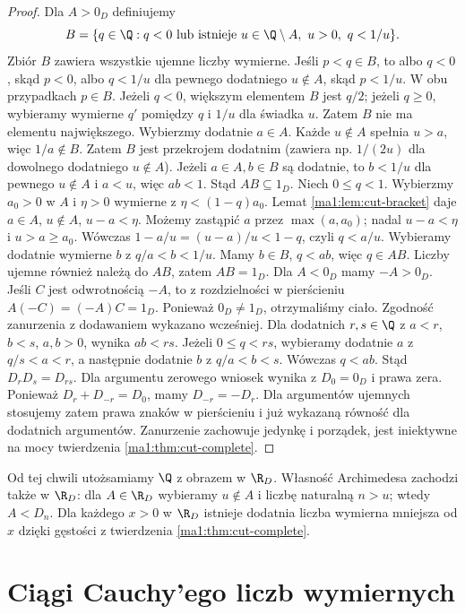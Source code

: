 \begin{proof}
Dla $A>0_D$ definiujemy
\[
 B=\{q\in\Q:q<0\ \text{lub istnieje }u\in\Q\setminus A,\ u>0,\ q<1/u\}.
\]
Zbiór $B$ zawiera wszystkie ujemne liczby wymierne. Jeśli $p<q\in B$, to albo $q<0$, skąd $p<0$, albo $q<1/u$ dla pewnego dodatniego $u\notin A$, skąd $p<1/u$. W obu przypadkach $p\in B$. Jeżeli $q<0$, większym elementem $B$ jest $q/2$; jeżeli $q\ge0$, wybieramy wymierne $q'$ pomiędzy $q$ i $1/u$ dla świadka $u$. Zatem $B$ nie ma elementu największego. Wybierzmy dodatnie $a\in A$. Każde $u\notin A$ spełnia $u>a$, więc $1/a\notin B$. Zatem $B$ jest przekrojem dodatnim (zawiera np. $1/(2u)$ dla dowolnego dodatniego $u\notin A$).
Jeżeli $a\in A,b\in B$ są dodatnie, to $b<1/u$ dla pewnego $u\notin A$ i $a<u$, więc $ab<1$. Stąd $AB\subseteq1_D$. Niech $0\le q<1$. Wybierzmy $a_0>0$ w $A$ i $\eta>0$ wymierne z $\eta<(1-q)a_0$. Lemat \ref{ma1:lem:cut-bracket} daje $a\in A$, $u\notin A$, $u-a<\eta$. Możemy zastąpić $a$ przez $\max(a,a_0)$; nadal $u-a<\eta$ i $u>a\ge a_0$. Wówczas $1-a/u=(u-a)/u<1-q$, czyli $q<a/u$. Wybieramy dodatnie wymierne $b$ z $q/a<b<1/u$. Mamy $b\in B$, $q<ab$, więc $q\in AB$. Liczby ujemne również należą do $AB$, zatem $AB=1_D$. Dla $A<0_D$ mamy $-A>0_D$. Jeśli $C$ jest odwrotnością $-A$, to z rozdzielności w pierścieniu $A(-C)=(-A)C=1_D$. Ponieważ $0_D\ne1_D$, otrzymaliśmy ciało.
Zgodność zanurzenia z dodawaniem wykazano wcześniej. Dla dodatnich $r,s\in\Q$ z $a<r$, $b<s$, $a,b>0$, wynika $ab<rs$. Jeżeli $0\le q<rs$, wybieramy dodatnie $a$ z $q/s<a<r$, a następnie dodatnie $b$ z $q/a<b<s$. Wówczas $q<ab$. Stąd $D_rD_s=D_{rs}$. Dla argumentu zerowego wniosek wynika z $D_0=0_D$ i prawa zera. Ponieważ $D_r+D_{-r}=D_0$, mamy $D_{-r}=-D_r$. Dla argumentów ujemnych stosujemy zatem prawa znaków w pierścieniu i już wykazaną równość dla dodatnich argumentów. Zanurzenie zachowuje jedynkę i porządek, jest iniektywne na mocy twierdzenia \ref{ma1:thm:cut-complete}.
\end{proof}
Od tej chwili utożsamiamy $\Q$ z obrazem w $\R_D$. Własność Archimedesa zachodzi także w $\R_D$: dla $A\in\R_D$ wybieramy $u\notin A$ i liczbę naturalną $n>u$; wtedy $A<D_n$. Dla każdego $x>0$ w $\R_D$ istnieje dodatnia liczba wymierna mniejsza od $x$ dzięki gęstości z twierdzenia \ref{ma1:thm:cut-complete}.

\section{Ciągi Cauchy'ego liczb wymiernych}
\label{ma1:sec:rational-cauchy}

